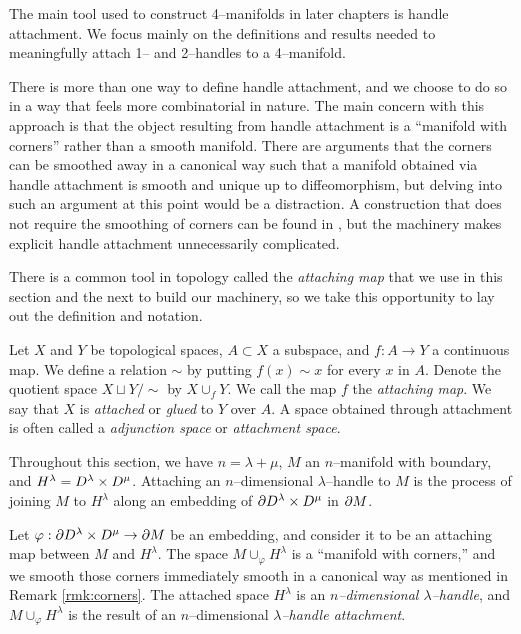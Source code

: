 The main tool used to construct 4--manifolds in later chapters is handle attachment.
We focus mainly on the definitions and results needed to meaningfully attach 1-- and 2--handles to a 4--manifold.

\begin{rmk}
	\label{rmk:corners}
	There is more than one way to define handle attachment, and we choose to do so in a way that feels more combinatorial in nature.
	The main concern with this approach is that the object resulting from handle attachment is a ``manifold with corners'' rather than a smooth manifold.
	There are arguments that the corners can be smoothed away in a canonical way such that a manifold obtained via handle attachment is smooth and unique up to diffeomorphism, but delving into such an argument at this point would be a distraction.
	A construction that does not require the smoothing of corners can be found in \cite{Kosi93}, but the machinery makes explicit handle attachment unnecessarily complicated.
\end{rmk}

There is a common tool in topology called the \emph{attaching map} that we use in this section and the next to build our machinery, so we take this opportunity to lay out the definition and notation.

\begin{defn}
  Let $X$ and $Y$ be topological spaces, $A\subset X$ a subspace, and $f:A\to Y$ a continuous map.
  We define a relation $\sim$ by putting $f(x)\sim x$ for every $x$ in $A$.
  Denote the quotient space $X\sqcup Y/\sim$ by $X\cup_f Y$.
  We call the map $f$ the \emph{attaching map}.  
  We say that $X$ is \emph{attached} or \emph{glued} to $Y$ over $A$.
  A space obtained through attachment is often called a \emph{adjunction space} or \emph{attachment space}.
\end{defn}

Throughout this section, we have $n=\lambda+\mu$, $M$ an $n$--manifold with boundary, and $H^\lambda=D^\lambda\times D^\mu$.
Attaching an $n$--dimensional $\lambda$--handle to $M$ is the process of joining $M$ to $H^\lambda$ along an embedding of $\partial D^\lambda\times D^\mu$ in $\partial M$. 

\begin{defn}[Handle]
	\label{def:handle}
	Let $\varphi:\partial D^\lambda\times D^\mu\to\partial M$ be an embedding, and consider it to be an attaching map between $M$ and $H^\lambda$.
	The space $M\cup_\varphi H^\lambda$ is a ``manifold with corners,'' and we smooth those corners immediately smooth in a canonical way as mentioned in Remark \ref{rmk:corners}.
	The attached space $H^\lambda$ is an \emph{$n$--dimensional $\lambda$--handle}, and $M\cup_\varphi H^\lambda$ is the result of an $n$--dimensional \emph{$\lambda$--handle attachment}.
\end{defn}

